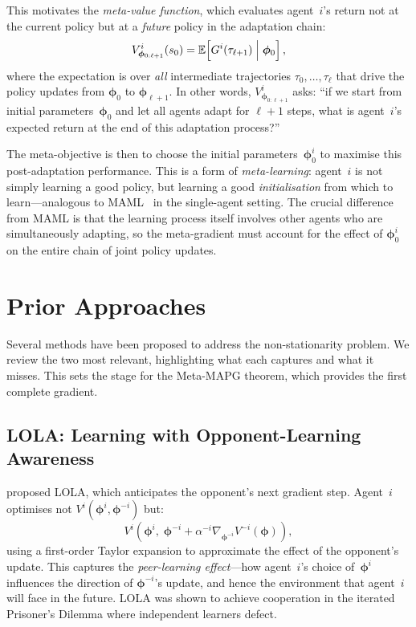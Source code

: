 This motivates the \emph{meta-value function}, which evaluates agent~$i$'s return not at the current policy but at a \emph{future} policy in the adaptation chain:
\begin{equation}\label{eq:meta-value}
  V^i_{\bm{\phi}_{0:\ell+1}}(s_0) = \mathbb{E}\!\left[G^i(\tau_{\ell+1})\;\Big|\;\bm{\phi}_0\right],
\end{equation}
where the expectation is over \emph{all} intermediate trajectories $\tau_0,\ldots,\tau_\ell$ that drive the policy updates from $\bm{\phi}_0$ to $\bm{\phi}_{\ell+1}$. In other words, $V^i_{\bm{\phi}_{0:\ell+1}}$ asks: ``if we start from initial parameters~$\bm{\phi}_0$ and let all agents adapt for $\ell+1$ steps, what is agent~$i$'s expected return at the end of this adaptation process?''

The meta-objective is then to choose the initial parameters~$\bm{\phi}_0^i$ to maximise this post-adaptation performance. This is a form of \emph{meta-learning}: agent~$i$ is not simply learning a good policy, but learning a good \emph{initialisation} from which to learn---analogous to MAML~\cite{finn2017} in the single-agent setting. The crucial difference from MAML is that the learning process itself involves other agents who are simultaneously adapting, so the meta-gradient must account for the effect of $\bm{\phi}_0^i$ on the entire chain of joint policy updates.

\section{Prior Approaches}
\label{sec:prior-approaches}

Several methods have been proposed to address the non-stationarity problem. We review the two most relevant, highlighting what each captures and what it misses. This sets the stage for the Meta-MAPG theorem, which provides the first complete gradient.

\subsection{LOLA: Learning with Opponent-Learning Awareness}
\label{subsec:lola}

\cite{foerster2018lola} proposed LOLA, which anticipates the opponent's next gradient step. Agent~$i$ optimises not $V^i(\bm{\phi}^i,\bm{\phi}^{-i})$ but:
\begin{equation}\label{eq:lola-objective}
  V^i\!\left(\bm{\phi}^i,\;\bm{\phi}^{-i}+\alpha^{-i}\nabla_{\bm{\phi}^{-i}}V^{-i}(\bm{\phi})\right),
\end{equation}
using a first-order Taylor expansion to approximate the effect of the opponent's update. This captures the \emph{peer-learning effect}---how agent~$i$'s choice of~$\bm{\phi}^i$ influences the direction of $\bm{\phi}^{-i}$'s update, and hence the environment that agent~$i$ will face in the future. LOLA was shown to achieve cooperation in the iterated Prisoner's Dilemma where independent learners defect.


